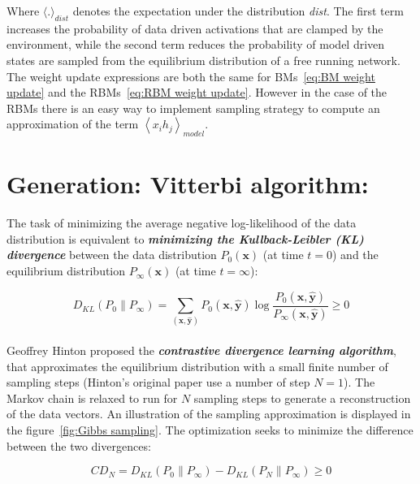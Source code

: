 \documentclass[a4paper,11pt]{report}
\newcommand{\Important}[1]{\textbf{{\em #1}}}
\begin{document}
		Where $\langle.\rangle_{dist}$ denotes the expectation under the distribution \textit{dist}. The first term increases the probability of data driven activations that are clamped by the environment, while the second term reduces the probability of model driven states are sampled from the equilibrium distribution of a free running network. The weight update expressions are both the same for BMs~\ref{eq:BM weight update} and the RBMs~\ref{eq:RBM weight update}. However in the case of the RBMs there is an easy way to implement sampling strategy to compute an approximation of the term $\left\langle x_{i}h_{j} \right\rangle_{model}$.
	
	
	\section{Generation: Vitterbi algorithm:}
		\label{seq:DBN/Training with contrastive divergence:}

		The task of minimizing the average negative log-likelihood of the data distribution is equivalent to \Important{minimizing the Kullback-Leibler (KL) divergence} \cite{Kullback_1951} between the data distribution $P_{0}(\mathbf{x})$ (at time $t=0$) and the equilibrium distribution $P_{\infty}(\mathbf{x})$ (at time $t=\infty$):
		
		\begin{equation}
			D_{KL}(P_{0}\|P_{\infty}) = \sum_{(\mathbf{x},\mathbf{\hat{y}})} {P_{0}(\mathbf{x},\mathbf{\hat{y}}) \log \frac{P_{0}(\mathbf{x},\mathbf{\hat{y}})}{P_{\infty}(\mathbf{x},\mathbf{\hat{y}})}} \geq 0
		\end{equation}\\
		
		Geoffrey Hinton \cite{Hinton_2002} proposed the \Important{contrastive divergence learning algorithm}, that approximates the equilibrium distribution with a small finite number of sampling steps (Hinton's original paper use a number of step $N=1$). The Markov chain is relaxed to run for $N$ sampling steps to generate a reconstruction of the data vectors. An illustration of the sampling approximation is displayed in the figure~\ref{fig:Gibbs sampling}. The optimization seeks to minimize the difference between the two divergences:
		
		\begin{equation}
			CD_{N} = D_{KL}(P_{0}\|P_{\infty}) - D_{KL}(P_{N}\|P_{\infty}) \geq 0
		\end{equation}\\
		
\end{document}

